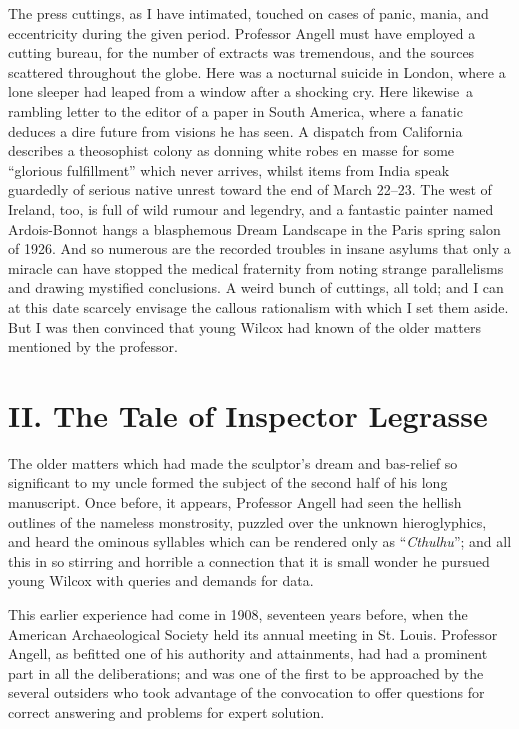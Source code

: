 The press cuttings, as I have intimated, touched on cases of panic,
mania, and eccentricity during the given period. Professor Angell must
have employed a cutting bureau, for the number of extracts was
tremendous, and the sources scattered throughout the globe. Here was a
nocturnal suicide in London, where a lone sleeper had leaped from a
window after a shocking cry. Here likewise\est\ a rambling letter to the
editor of a paper in South America, where a fanatic deduces a dire
future from visions he has seen. A dispatch from California describes a
theosophist colony as donning white robes en masse for some ``glorious
fulfillment'' which never arrives, whilst items from India speak
guardedly of serious native unrest toward the end of March 22--23.
The west of Ireland, too, is full of wild rumour and legendry, and a
fantastic painter named Ardois-Bonnot hangs a blasphemous Dream
Landscape in the Paris spring salon of 1926. And so numerous are the
recorded troubles in insane asylums that only a miracle can have stopped
the medical fraternity from noting strange parallelisms and drawing
mystified conclusions. A weird bunch of cuttings, all told; and I can at
this date scarcely envisage the callous rationalism with which I set
them aside. But I was then convinced that young Wilcox had known of the
older matters mentioned by the professor.

\pagebreak

{\let\clearpage\relax\chapter*{II. The Tale of Inspector Legrasse}}

\noindent{}The older matters which had made the sculptor's dream and bas-relief so
significant to my uncle formed the subject of the second half of his
long manuscript. Once before, it appears, Professor Angell had seen the
hellish outlines of the nameless monstrosity, puzzled over the unknown
hieroglyphics, and heard the ominous syllables which can be rendered
only as ``\emph{Cthulhu}''; and all this in so stirring and horrible a
connection that it is small wonder he pursued young Wilcox with queries
and demands for data.

This earlier experience had come in 1908, seventeen years before, when
the American Archaeological Society held its annual meeting in St.
Louis. Professor Angell, as befitted one of his authority and
attainments, had had a prominent part in all the deliberations; and was
one of the first to be approached by the several outsiders who took
advantage of the convocation to offer questions for correct answering
and problems for expert solution.

